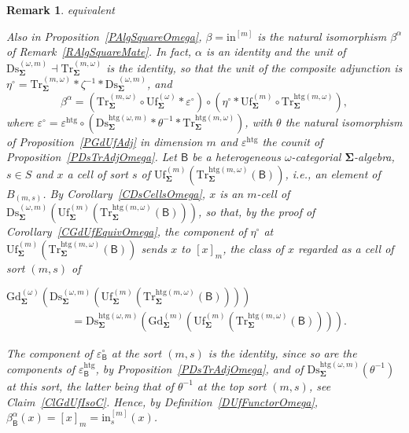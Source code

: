 \documentclass[a4paper, reqno]{amsbook}
\makeatletter
\newcommand{\sig}[1]{\mathbf{#1}}             %
\newcommand{\calg}[1]{\boldsymbol{\mathsf{#1}}} %
\newcommand{\htg}{\mathrm{htg}}                %
\newcommand{\Gd}{\mathrm{Gd}}
\newcommand{\Uf}{\mathrm{Uf}}
\newcommand{\Ds}{\mathrm{Ds}}
\newcommand{\Tr}{\mathrm{Tr}}
\theoremstyle{plain}
\newtheorem{remark}[theorem]{Remark}
\theoremstyle{definition}
\newcommand*{\CA@leanpending}{}
\newcommand*{\CA@leanrelation}{}
\newcommand*{\lean}[2]{%
  \ifcsname\string\color@lean@#1\endcsname\else
    \PackageError{main}{Unknown relation `#1' in \string\lean}{Use equivalent, weaker or stronger.}%
  \fi
  \gdef\CA@leanrelation{#1}%
  \gdef\CA@leanpending{#2}}
\makeatother
\begin{document}
\begin{remark}\label{RAlgSquareOmegaMate}\lean{equivalent}{Omega.truncationUnificationFunctor_eq_conjugate}
Also in Proposition~\ref{PAlgSquareOmega}, $\beta=\mathrm{in}^{[m]}$ is the natural isomorphism $\beta^{\alpha}$ of Remark~\ref{RAlgSquareMate}.
In fact, $\alpha$ is an identity and the unit of $\Ds^{(\omega,m)}_{\sig{\Sigma}}\dashv\Tr^{(m,\omega)}_{\sig{\Sigma}}$ is the identity, so that the unit of the composite adjunction is $\eta^{\circ}=\Tr^{(m,\omega)}_{\sig{\Sigma}}\ast\zeta^{-1}\ast\Ds^{(\omega,m)}_{\sig{\Sigma}}$, and
$$
\beta^{\alpha}=\left(\Tr^{(m,\omega)}_{\sig{\Sigma}}\circ\Uf^{(\omega)}_{\sig{\Sigma}}\ast\varepsilon^{\circ}\right)\circ\left(\eta^{\circ}\ast\Uf^{(m)}_{\sig{\Sigma}}\circ\Tr^{\htg(m,\omega)}_{\sig{\Sigma}}\right),
$$
where $\varepsilon^{\circ}=\varepsilon^{\htg}\circ(\Ds^{\htg(\omega,m)}_{\sig{\Sigma}}\ast\theta^{-1}\ast\Tr^{\htg(m,\omega)}_{\sig{\Sigma}})$, with $\theta$ the natural isomorphism of Proposition~\ref{PGdUfAdj} in dimension $m$ and $\varepsilon^{\htg}$ the counit of Proposition~\ref{PDsTrAdjOmega}.
Let $\calg{B}$ be a heterogeneous $\omega$-categorial $\sig{\Sigma}$-algebra, $s\in S$ and $x$ a cell of sort $s$ of $\Uf^{(m)}_{\sig{\Sigma}}(\Tr^{\htg(m,\omega)}_{\sig{\Sigma}}(\calg{B}))$, i.e., an element of $B_{(m,s)}$.
By Corollary~\ref{CDsCellsOmega}, $x$ is an $m$-cell of $\Ds^{(\omega,m)}_{\sig{\Sigma}}(\Uf^{(m)}_{\sig{\Sigma}}(\Tr^{\htg(m,\omega)}_{\sig{\Sigma}}(\calg{B})))$, so that, by the proof of Corollary~\ref{CGdUfEquivOmega}, the component of $\eta^{\circ}$ at $\Uf^{(m)}_{\sig{\Sigma}}(\Tr^{\htg(m,\omega)}_{\sig{\Sigma}}(\calg{B}))$ sends $x$ to $[x]_{m}$, the class of $x$ regarded as a cell of sort $(m,s)$ of
\begin{flushleft}
$
\Gd^{(\omega)}_{\sig{\Sigma}}\left(\Ds^{(\omega,m)}_{\sig{\Sigma}}\left(\Uf^{(m)}_{\sig{\Sigma}}\left(\Tr^{\htg(m,\omega)}_{\sig{\Sigma}}(\calg{B})\right)\right)\right)
$
\begin{align*}
&=
\Ds^{\htg(\omega,m)}_{\sig{\Sigma}}\left(\Gd^{(m)}_{\sig{\Sigma}}\left(\Uf^{(m)}_{\sig{\Sigma}}\left(\Tr^{\htg(m,\omega)}_{\sig{\Sigma}}(\calg{B})\right)\right)\right).
\end{align*}
\end{flushleft}
The component of $\varepsilon^{\circ}_{\calg{B}}$ at the sort $(m,s)$ is the identity, since so are the components of $\varepsilon^{\htg}_{\calg{B}}$, by Proposition~\ref{PDsTrAdjOmega}, and of $\Ds^{\htg(\omega,m)}_{\sig{\Sigma}}(\theta^{-1})$ at this sort, the latter being that of $\theta^{-1}$ at the top sort $(m,s)$, see Claim~\ref{ClGdUfIsoC}.
Hence, by Definition~\ref{DUfFunctorOmega}, $\beta^{\alpha}_{\calg{B}}(x)=[x]_{m}=\mathrm{in}^{[m]}_{s}(x)$.
\end{remark}
\end{document}
